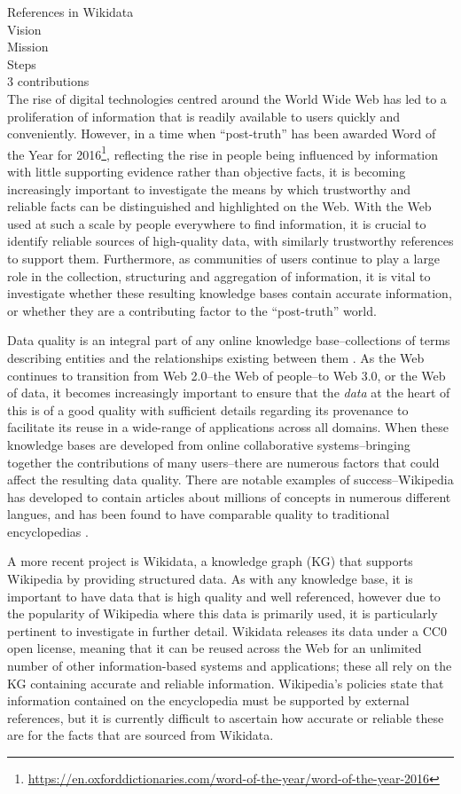 \documentclass{llncs}
\begin{document}
References in Wikidata\\
Vision\\
Mission\\
Steps\\
3 contributions\\


The rise of digital technologies centred around the World Wide Web has led to a proliferation of information that is readily available to users quickly and conveniently. However, in a time when ``post-truth'' has been awarded Word of the Year for 2016\footnote{\url{https://en.oxforddictionaries.com/word-of-the-year/word-of-the-year-2016}}, reflecting the rise in people being influenced by information with little supporting evidence rather than objective facts, it is becoming increasingly important to investigate the means by which trustworthy and reliable facts can be distinguished and highlighted on the Web. With the Web used at such a scale by people everywhere to find information, it is crucial to identify reliable sources of high-quality data, with similarly trustworthy references to support them. Furthermore, as communities of users continue to play a large role in the collection, structuring and aggregation of information, it is vital to investigate whether these resulting knowledge bases contain accurate information, or whether they are a contributing factor to the ``post-truth'' world. 

Data quality is an integral part of any online knowledge base--collections of terms describing entities and the relationships existing between them \cite{DBLP:series/ihis/2009hoo}. As the Web continues to transition from Web 2.0--the Web of people--to Web 3.0, or the Web of data, it becomes increasingly important to ensure that the \emph{data} at the heart of this is of a good quality with sufficient details regarding its provenance to facilitate its reuse in a wide-range of applications across all domains. When these knowledge bases are developed from online collaborative systems--bringing together the contributions of many users--there are numerous factors that could affect the resulting data quality. There are notable examples of success--Wikipedia has developed to contain articles about millions of concepts in numerous different langues, and has been found to have comparable quality to traditional encyclopedias \cite{giles2005internet}.

A more recent project is Wikidata, a knowledge graph (KG) that supports Wikipedia by providing structured data. As with any knowledge base, it is important to have data that is high quality and well referenced, however due to the popularity of Wikipedia where this data is primarily used, it is particularly pertinent to investigate in further detail. Wikidata releases its data under a CC0 open license, meaning that it can be reused across the Web for an unlimited number of other information-based systems and applications; these all rely on the KG containing accurate and reliable information. Wikipedia's policies state that information contained on the encyclopedia must be supported by external references, but it is currently difficult to ascertain how accurate or reliable these are for the facts that are sourced from Wikidata. 
\end{document}
